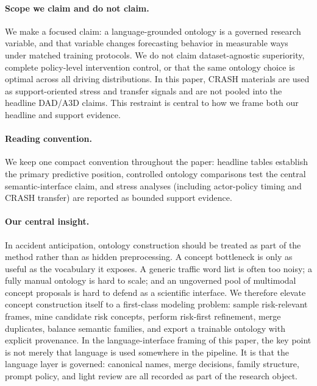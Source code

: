 \paragraph{Scope we claim and do not claim.}
We make a focused claim: a language-grounded ontology is a governed research
variable, and that variable changes forecasting behavior in measurable ways under
matched training protocols.
We do not claim dataset-agnostic superiority, complete policy-level intervention control,
or that the same ontology choice is optimal across all driving distributions.
In this paper, CRASH materials are used as support-oriented stress and transfer
signals and are not pooled into the headline DAD/A3D claims.
This restraint is central to how we frame both our headline and support evidence.

\paragraph{Reading convention.}
We keep one compact convention throughout the paper: headline tables establish
the primary predictive position, controlled ontology comparisons test the
central semantic-interface claim, and stress analyses (including actor-policy
timing and CRASH transfer) are reported as bounded support evidence.

\paragraph{Our central insight.}
In accident anticipation, ontology construction should be treated as part of
the method rather than as hidden preprocessing.
A concept bottleneck is only as useful as the vocabulary it exposes. A generic
traffic word list is often too noisy; a fully manual ontology is hard to scale;
and an ungoverned pool of multimodal concept proposals is hard to defend as a
scientific interface. We therefore elevate concept construction itself to a
first-class modeling problem: sample risk-relevant frames, mine candidate risk
concepts, perform risk-first refinement, merge duplicates, balance semantic
families, and export a trainable ontology with explicit provenance. In the
language-interface framing of this paper, the key point is not merely that language is used
somewhere in the pipeline. It is that the language layer is governed:
canonical names, merge decisions, family structure, prompt policy, and light
review are all recorded as part of the research object.

